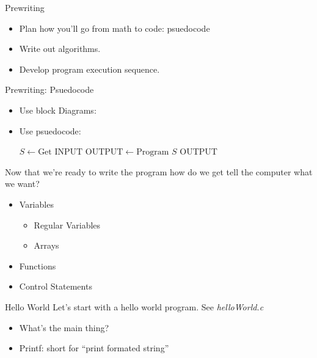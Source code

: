 \documentclass[main.tex]{subfile}
\begin{document}
\begin{frame}{Prewriting}
	\begin{itemize}
		\item Plan how you'll go from math to code: psuedocode
		\item Write out algorithms.
		\item Develop program execution sequence.
	\end{itemize}
\end{frame}

\begin{frame}[fragile]{Prewriting: Psuedocode}
	\begin{itemize}
		\item Use block Diagrams: 
		\item Use psuedocode: 
			\begin{algorithmic}
				\STATE $S \leftarrow \text{Get INPUT}$
				\STATE $\text{OUTPUT} \leftarrow \text{Program } S$
				\RETURN OUTPUT
			\end{algorithmic}

	\end{itemize}
\end{frame}

\begin{frame}
	
	Now that we're ready to write the program how do we get tell the computer what
	we want?

	\begin{itemize}
		\item Variables
			\begin{itemize}
				\item Regular Variables
				\item Arrays
			\end{itemize}
		\item Functions
		\item Control Statements
	\end{itemize}

\end{frame}


\begin{frame}{Hello World}
	Let's start with a hello world program. See \textit{helloWorld.c}
	\begin{itemize}
		\item What's the main thing?
		\item Printf: short for ``print formated string''
	\end{itemize}
\end{frame}
\end{document}
